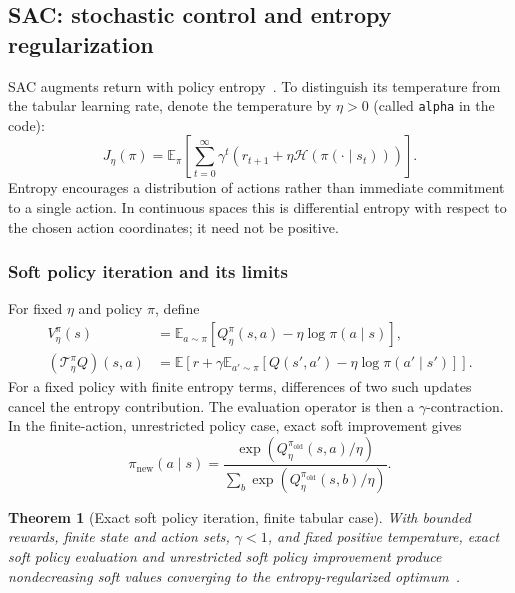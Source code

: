 \documentclass[11pt,a4paper]{article}
\theoremstyle{definition}
\theoremstyle{plain}
\newtheorem{theorem}{Theorem}[section]
\theoremstyle{remark}
\newcommand{\code}[1]{\texttt{#1}}
\newcommand{\E}{\mathbb{E}}
\begin{document}
\subsection{SAC: stochastic control and entropy regularization}
\label{sec:sac}

SAC augments return with policy entropy~\cite{haarnoja2018,haarnoja2019}. To distinguish its temperature from the tabular learning rate, denote the temperature by $\eta>0$ (called \code{alpha} in the code):
\begin{equation}
 J_\eta(\pi)=\E_\pi\!\left[\sum_{t=0}^{\infty}\gamma^t
   \left(r_{t+1}+\eta\mathcal H(\pi(\cdot\mid s_t))\right)\right].
 \label{eq:sac-objective}
\end{equation}
Entropy encourages a distribution of actions rather than immediate commitment to a single action. In continuous spaces this is differential entropy with respect to the chosen action coordinates; it need not be positive.

\subsubsection{Soft policy iteration and its limits}

For fixed $\eta$ and policy $\pi$, define
\begin{align}
 V^\pi_\eta(s)&=\E_{a\sim\pi}[Q^\pi_\eta(s,a)-\eta\log\pi(a\mid s)],\\
 (\mathcal T^\pi_\eta Q)(s,a)
   &=\E\left[r+\gamma\E_{a'\sim\pi}
       [Q(s',a')-\eta\log\pi(a'\mid s')]\right].
\end{align}
For a fixed policy with finite entropy terms, differences of two such updates cancel the entropy contribution. The evaluation operator is then a $\gamma$-contraction. In the finite-action, unrestricted policy case, exact soft improvement gives
\begin{equation}
 \pi_{\mathrm{new}}(a\mid s)=
 \frac{\exp(Q^{\pi_{\mathrm{old}}}_\eta(s,a)/\eta)}
      {\sum_b\exp(Q^{\pi_{\mathrm{old}}}_\eta(s,b)/\eta)}.
\end{equation}

\begin{theorem}[Exact soft policy iteration, finite tabular case]
With bounded rewards, finite state and action sets, $\gamma<1$, and fixed positive temperature, exact soft policy evaluation and unrestricted soft policy improvement produce nondecreasing soft values converging to the entropy-regularized optimum~\cite{haarnoja2018}.
\end{theorem}
\end{document}
